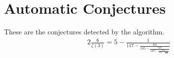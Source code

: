 \documentclass{article}%
\begin{document}
%
\normalsize%
\section{Automatic Conjectures}%
\label{sec:AutomaticConjectures}%
These are the conjectures detected by the algorithm.%
\begin{alignat*}{2}%
\frac{6}{\zeta\left(3\right)} = 5 - \frac{1}{117 - \frac{64}{535 - \frac{729}{1463 - \frac{4096}{3105 - \frac{15625}{..}}}}}%
\end{alignat*}

%
\end{document}
